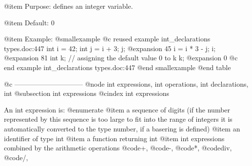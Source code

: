 @item Purpose:
defines an integer variable.

@item Default:
0

@item Example:
@smallexample
@c reused example int_declarations types.doc:447 
  int i = 42;
  int j = i + 3; j;
@expansion{} 45
  i = i * 3 - j; i;
@expansion{} 81
  int k;   // assigning the default value 0 to k
  k;
@expansion{} 0
@c end example int_declarations types.doc:447
@end smallexample
@end table

@c ------------------------------
@node int expressions, int operations, int declarations, int
@subsection int expressions
@cindex int expressions

An int expression is:
@enumerate
@item
a sequence of digits (if the number represented by this sequence is too
large to fit into the range of integers it is automatically
converted to the type number, if a basering is defined)
@item
an identifier of type int
@item
a function returning int
@item
int expressions combined by the arithmetic operations
@code{+}, @code{-}, @code{*}, @code{div}, @code{/},
